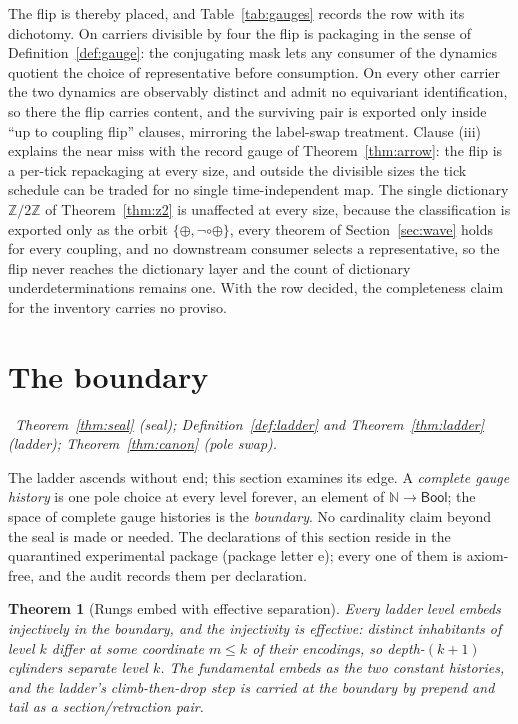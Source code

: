 \documentclass[11pt,a4paper]{article}
\theoremstyle{plain}
\newtheorem{theorem}{Theorem}[section]
\theoremstyle{definition}
\theoremstyle{remark}
\newcommand{\Bool}{\mathsf{Bool}}
\newcommand{\comp}{\circ}
\newcommand{\Ztwo}{\mathbb{Z}/2\mathbb{Z}}
\newcommand{\dep}[1]{%
  \par\noindent{\small\color{muted}\sffamily Dependence:}~\textit{#1}\par\medskip}
\begin{document}
The flip is thereby placed, and Table~\ref{tab:gauges} records the
row with its dichotomy. On carriers divisible by four the flip is
packaging in the sense of Definition~\ref{def:gauge}: the conjugating
mask lets any consumer of the dynamics quotient the choice of
representative before consumption. On every other carrier the two
dynamics are observably distinct and admit no equivariant
identification, so there the flip carries content, and the surviving
pair is exported only inside ``up to coupling flip'' clauses,
mirroring the label-swap treatment. Clause (iii) explains the near
miss with the record gauge of Theorem~\ref{thm:arrow}: the flip is a
per-tick repackaging at every size, and outside the divisible sizes
the tick schedule can be traded for no single time-independent map.
The single dictionary $\Ztwo$ of Theorem~\ref{thm:z2} is unaffected
at every size, because the classification is exported only as the
orbit $\{\oplus,\neg\comp\oplus\}$, every theorem of
Section~\ref{sec:wave} holds for every coupling, and no downstream
consumer selects a representative, so the flip never reaches the
dictionary layer and the count of dictionary underdeterminations
remains one. With the row decided, the completeness claim for the
inventory carries no proviso.


\section{The boundary}
\label{sec:boundary}

\dep{Theorem~\ref{thm:seal} (seal); Definition~\ref{def:ladder} and
Theorem~\ref{thm:ladder} (ladder); Theorem~\ref{thm:canon} (pole
swap).}

The ladder ascends without end; this section examines its edge. A
\emph{complete gauge history} is one pole choice at every level
forever, an element of $\mathbb{N}\to\Bool$; the space of complete
gauge histories is the \emph{boundary}. No cardinality claim beyond
the seal is made or needed. The declarations of this section reside in
the quarantined experimental package (package letter e); every one of
them is axiom-free, and the audit records them per declaration.

\begin{theorem}[Rungs embed with effective separation]
\label{thm:rungs}
Every ladder level embeds injectively in the boundary, and the
injectivity is effective: distinct inhabitants of level $k$ differ at
some coordinate $m\le k$ of their encodings, so depth-$(k{+}1)$
cylinders separate level $k$. The fundamental embeds as the two
constant histories, and the ladder's climb-then-drop step is carried
at the boundary by prepend and tail as a section/retraction pair.
\end{theorem}
\end{document}
